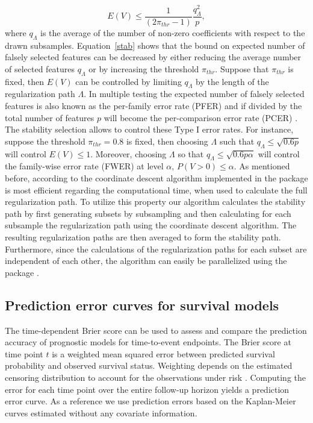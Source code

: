 \documentclass[nojss]{jss}
\begin{document}
\begin{equation}\label{stab}
E(V) \leq \frac{1}{(2\pi_{thr}-1)} \frac{q^{2}_{\Lambda}}{p},
\end{equation}
where $q_{\Lambda}$ is the average of the number of non-zero coefficients with respect to the drawn subsamples.  
Equation~\ref{stab} shows that the bound on expected number of falsely selected features can be decreased by either reducing the average number of selected features $q_{\Lambda}$ or by increasing the threshold $\pi_{thr}$. Suppose that $\pi_{thr}$ is fixed, then $E(V)$ can be controlled by limiting $q_{\Lambda}$ by the length of the regularization path $\Lambda$. In multiple testing the expected number of falsely selected features is also known as the per-family error rate (PFER) and if divided by the total number of features $p$ will become the per-comparison error rate (PCER) \citep{Dudoit2003}. The stability selection allows to control these Type I error rates. For instance, suppose the threshold $\pi_{thr} = 0.8$ is fixed, then choosing $\Lambda$ such that $q_{\Lambda} \leq \sqrt{0.6p}$ will control $E(V)\leq 1$. Moreover, choosing $\Lambda$ so that $q_{\Lambda} \leq \sqrt{0.6p\alpha}$ will control the family-wise error rate (FWER) at level $\alpha$, $P(V>0) \leq \alpha$.
As mentioned before, according to \citet{FHT2010} the coordinate descent algorithm implemented in the  package is most efficient regarding the computational time, when used to calculate the full regularization path. To utilize this property our algorithm calculates the stability path by first generating subsets by subsampling and then calculating for each subsample the regularization path using the coordinate descent algorithm. The resulting regularization paths are then averaged to form the stability path. Furthermore, since the calculations of the regularization paths for each subset are independent of each other, the algorithm can easily be parallelized using the package . %

\subsection{Prediction error curves for survival models}

The time-dependent Brier score \citep{graf99} can be used to assess and compare the prediction accuracy of prognostic models for time-to-event endpoints.
The Brier score at time point $t$ is a weighted mean squared error between predicted survival probability and observed survival status.
Weighting depends on the estimated censoring distribution to account for the observations under risk \citep{gerds2006}. Computing the error for each time point over the entire follow-up horizon yields a prediction error curve. As a reference we use prediction errors based on the Kaplan-Meier curves estimated without any covariate information. 
\end{document}
